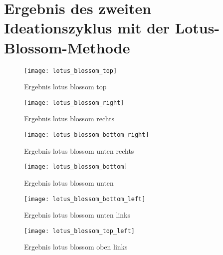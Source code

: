 \section{Ergebnis des zweiten Ideationszyklus mit der Lotus-Blossom-Methode} \label{appendix:lotus_blossom}

\begin{figure}[H]
  \centering
  \texttt{[image: lotus\_blossom\_top]}
  \caption{Ergebnis lotus blossom top}
  \label{fig:lotus_blossom_top}
\end{figure}
\begin{figure}[H]
  \centering
  \texttt{[image: lotus\_blossom\_right]}
  \caption{Ergebnis lotus blossom rechts}
  \label{fig:lotus_blossom_right}
\end{figure}
\begin{figure}[H]
  \centering
  \texttt{[image: lotus\_blossom\_bottom\_right]}
  \caption{Ergebnis lotus blossom unten rechts}
  \label{fig:lotus_blossom_bottom_right}
\end{figure}
\begin{figure}[H]
  \centering
  \texttt{[image: lotus\_blossom\_bottom]}
  \caption{Ergebnis lotus blossom unten}
  \label{fig:lotus_blossom_bottom}
\end{figure}
\begin{figure}[H]
  \centering
  \texttt{[image: lotus\_blossom\_bottom\_left]}
  \caption{Ergebnis lotus blossom unten links}
  \label{fig:lotus_blossom_bottom_left}
\end{figure}
\begin{figure}[H]
  \centering
  \texttt{[image: lotus\_blossom\_top\_left]}
  \caption{Ergebnis lotus blossom oben links}
  \label{fig:lotus_blossom_top_left}
\end{figure}